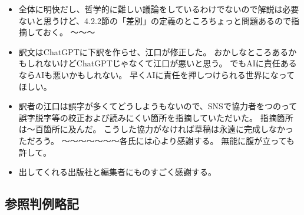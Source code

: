 \documentclass[paper=a4,book,openany]{jlreq}
\begin{document}
\begin{itemize}
\item 全体に明快だし、哲学的に難しい議論をしているわけでないので解説は必要ないと思うけど、4.2.2節の「差別」の定義のところちょっと問題あるので指摘しておく。
〜〜〜

\item 訳文はChatGPTに下訳を作らせ、江口が修正した。
おかしなところあるかもしれないけどChatGPTじゃなくて江口が悪いと思う。
でもAIに責任あるならAIも悪いかもしれない。
早くAIに責任を押しつけられる世界になってほしい。
\item 訳者の江口は誤字が多くてどうしようもないので、SNSで協力者をつのって誤字脱字等の校正および読みにくい箇所を指摘していただいた。
指摘箇所は〜百箇所に及んだ。
こうした協力がなければ草稿は永遠に完成しなかっただろう。
〜〜〜〜〜〜〜各氏には心より感謝する。
無能に腹が立っても許して。
\item 出してくれる出版社と編集者にものすごく感謝する。
\end{itemize}
\fi

{\footnotesize
{}
{}

  
}

\subsection*{参照判例略記}
\end{document}
